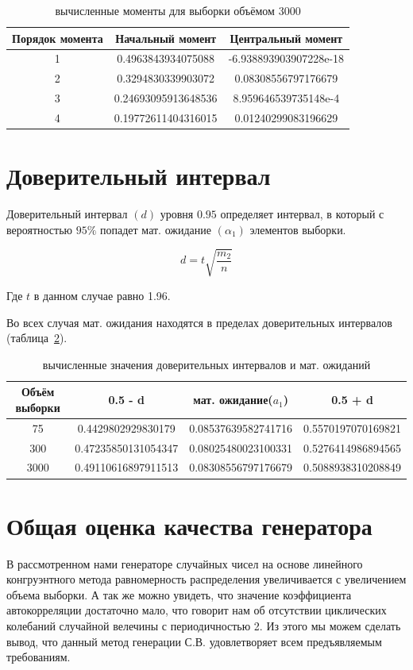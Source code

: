 \documentclass[a4paper,12pt]{article}
\begin{document}
\begin{table}[h]
	\caption{вычисленные моменты для выборки объёмом 3000}
	\begin{tabular}{|c|c|c|}
	\hline 
	Порядок момента & Начальный момент & Центральный момент \\ 
	\hline 
	1 & 0.4963843934075088 & -6.938893903907228e-18 \\ 
	\hline 
	2 & 0.3294830339903072 & 0.08308556797176679 \\ 
	\hline 
	3 & 0.24693095913648536 & 8.959646539735148e-4 \\ 
	\hline 
	4 & 0.19772611404316015 & 0.01240299083196629 \\ 
	\hline 
	\end{tabular} 
	
	\label{table:a_u_3}
\end{table}

\newpage\section{Доверительный интервал}
Доверительный интервал $(d)$ уровня $0.95$ определяет интервал, в который с вероятностью $95\%$ попадет мат. ожидание $(\alpha_1)$ элементов выборки.

{\large $$d=t\sqrt{\frac{m_2}{n}}$$}

Где $t$ в данном случае равно 1.96.

Во всех случая мат. ожидания находятся в пределах доверительных интервалов (таблица~\ref{table:d}).

\begin{table}[h]
	\caption{вычисленные значения доверительных интервалов и мат. ожиданий}
	\begin{tabular}{|c|c|c|c|}
	\hline 
	Объём выборки & 0.5 - d & мат. ожидание($a_1$) & 0.5 + d \\ 
	\hline 
	75 & 0.4429802929830179 & 0.08537639582741716 & 0.5570197070169821 \\ 
	\hline 
	300 & 0.47235850131054347 & 0.08025480023100331 & 0.5276414986894565 \\ 
	\hline 
	3000 & 0.49110616897911513 & 0.08308556797176679 & 0.5088938310208849 \\ 
	\hline 
	\end{tabular}
	\label{table:d} 
\end{table}

\newpage\section{Общая оценка качества генератора}
В рассмотренном нами генераторе случайных чисел на основе линейного конгруэнтного метода равномерность распределения увеличивается с увеличением объема выборки. А так же можно увидеть, что значение коэффициента автокорреляции достаточно мало, что говорит нам об отсутствии циклических колебаний случайной велечины с периодичностью 2. Из этого мы можем сделать вывод, что данный метод генерации С.В. удовлетворяет всем предъявляемым требованиям. 
\end{document}
